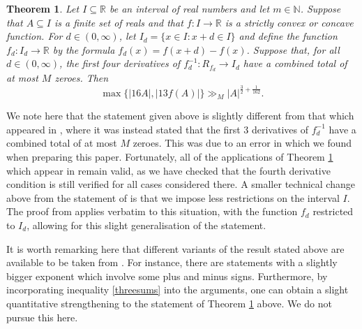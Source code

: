 \documentclass[11pt]{amsart}
\newcommand{\N}{\mathbb{N}}
\newcommand{\R}{\mathbb{R}}
\newtheorem{theorem}{Theorem}[section]
\begin{document}
\begin{theorem}\label{core}
    Let $I\subseteq\R$ be an interval of real numbers and let $m\in\N$. Suppose
that $A\subseteq I$ is a finite set of reals and that $f : I \rightarrow\R$ is a strictly convex or concave function. For $d\in(0,\infty)$, let $I_d=\{x\in I:x+d\in I\}$ and define the function $f_d:I_d\rightarrow\R$ by the formula $f_d(x) = f(x+d)-f(x)$. Suppose that, for all $d \in (0, \infty)$, the first four derivatives of $f_d^{-1}:R_{f_d}\rightarrow I_d$ have a combined total of at most $M$ zeroes. Then 
\[
    \max \{|16A|, |13f(A)| \} \gg_M |A|^{\frac{3}{2} +\frac{1}{162}}.
    \]
\end{theorem}
We note here that the statement given above is slightly different from that which appeared in \cite{Ro}, where it was instead stated that the first $3$ derivatives of $f_d^{-1}$ have a combined total of at most $M$ zeroes. This was due to an error in \cite{Ro} which we found when preparing this paper. Fortunately, all of the applications of Theorem \ref{core} which appear in \cite{Ro} remain valid, as we have checked that the fourth derivative condition is still verified for all cases considered there. A smaller technical change above from the statement of \cite{Ro} is that we impose less restrictions on the interval $I$. The proof from \cite{Ro} applies verbatim to this situation, with the function $f_d$ restricted to $I_d$, allowing for this slight generalisation of the statement.


It is worth remarking here that different variants of the result stated above are available to be taken from \cite{Ro}. For instance, there are statements with a slightly bigger exponent which involve some plus and minus signs. Furthermore, by incorporating inequality \eqref{threesums} into the arguments, one can obtain a slight quantitative strengthening to the statement of Theorem \ref{core} above. We do not pursue this here.
\end{document}
